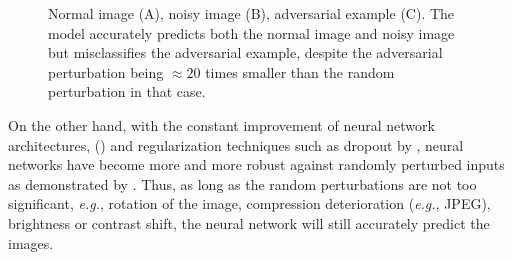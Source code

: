 \begin{figure}[!htb]
      

    \caption{ Normal image (A), noisy image (B), adversarial example (C). The
        model accurately predicts both the normal image and noisy image but
        misclassifies the adversarial example, despite the adversarial
        perturbation being $\approx{20}$ times smaller than the random
        perturbation in that case. }
    \label{fig:noise}
\end{figure}

On the other hand, with the constant improvement of neural network
architectures, (\cite{he_deep_2015,vaswani_attention_2017,huang_densely_2018})
and regularization techniques such as dropout by \cite{srivastava_dropout_2014},
neural networks have become more and more robust against randomly perturbed
inputs as demonstrated by \cite{hendrycks_benchmarking_2019}. Thus, as long as
the random perturbations are not too significant, \emph{e.g.}, rotation of the
image, compression deterioration (\emph{e.g.}, JPEG), brightness or contrast
shift, the neural network will still accurately predict the images.

